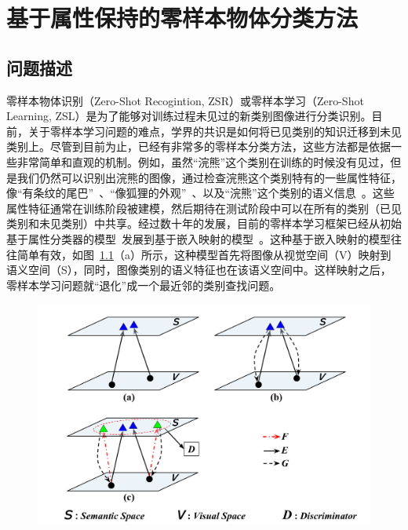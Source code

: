 \chapter{基于属性保持的零样本物体分类方法}



\section{问题描述}


零样本物体识别（Zero-Shot Recogintion, ZSR）或零样本学习（Zero-Shot Learning, ZSL）是为了能够对训练过程未见过的新类别图像进行分类识别。目前，关于零样本学习问题的难点，学界的共识是如何将已见类别的知识迁移到未见类别上。尽管到目前为止，已经有非常多的零样本分类方法，这些方法都是依据一些非常简单和直观的机制。例如，虽然“浣熊”这个类别在训练的时候没有见过，但是我们仍然可以识别出浣熊的图像，通过检查浣熊这个类别特有的一些属性特征，像“有条纹的尾巴”~\cite{farhadi2009describing,lampert2009learning,zhang2013attribute,li2010object}、“像狐狸的外观”~\cite{torresani2010efficient,li2010object}、以及“浣熊”这个类别的语义信息~\cite{pennington2014glove,mikolov2013distributed}。这些属性特征通常在训练阶段被建模，然后期待在测试阶段中可以在所有的类别（已见类别和未见类别）中共享。经过数十年的发展，目前的零样本学习框架已经从初始基于属性分类器的模型~\cite{lampert2009learning}发展到基于嵌入映射的模型~\cite{akata2015label,frome2013devise,weston2010large}。这种基于嵌入映射的模型往往简单有效，如图~\ref{ch3:fig:zsl_paradigms}（a）所示，这种模型首先将图像从视觉空间（V）映射到语义空间（S），同时，图像类别的语义特征也在该语义空间中。这样映射之后，零样本学习问题就“退化”成一个最近邻的类别查找问题。

\begin{figure}
    \centering
        \includegraphics[width=0.95\linewidth]{chapter3/res/zsl_paradigms.pdf}
    \label{ch3:fig:zsl_paradigms}
\end{figure}


